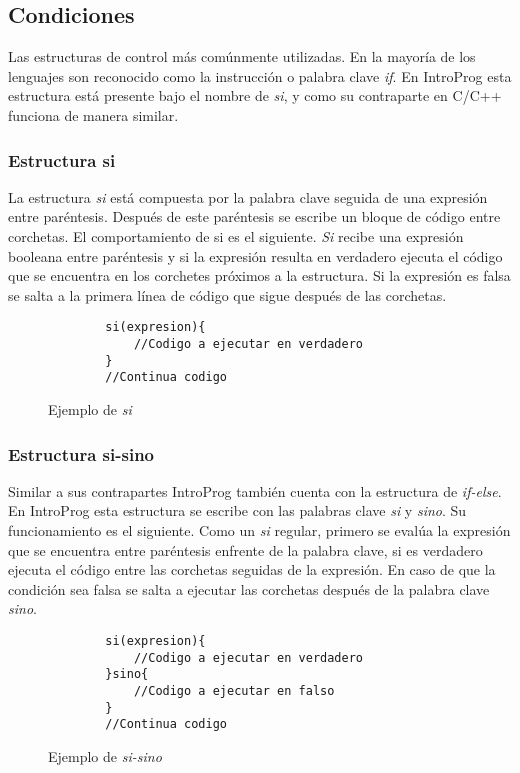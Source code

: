 \subsection{Condiciones}
Las estructuras de control más comúnmente utilizadas. En la mayoría de los lenguajes son reconocido como la instrucción o palabra clave \emph{if}. En IntroProg esta estructura está presente bajo el nombre de \emph{si}, y como su contraparte en C/C++ funciona de manera similar.
\subsubsection{Estructura si}
La estructura \emph{si} está compuesta por la palabra clave seguida de una expresión entre paréntesis. Después de este paréntesis se escribe un bloque de código entre corchetas. El comportamiento de si es el siguiente.
 \emph{Si} recibe una expresión booleana entre paréntesis y si la expresión resulta en verdadero ejecuta el código que se encuentra en los corchetes próximos a la estructura. Si la expresión es falsa se salta a la primera línea de código que sigue después de las corchetas.

\begin{figure}[!htbp]
    \centering
    
    \begin{lstlisting}
        si(expresion){
            //Codigo a ejecutar en verdadero
        }
        //Continua codigo
    \end{lstlisting}
    \caption{Ejemplo de \emph{si}}
\end{figure}
\FloatBarrier
\subsubsection{Estructura si-sino}
Similar a sus contrapartes IntroProg también cuenta con la estructura de \emph{if-else}. En IntroProg esta estructura se escribe con las palabras clave \emph{si} y \emph{sino}. Su funcionamiento es el siguiente. Como un \emph{si} regular, primero se evalúa la expresión que se encuentra entre paréntesis enfrente de la palabra clave, si es verdadero ejecuta el código entre las corchetas seguidas de la expresión. En caso de que la condición sea falsa se salta a ejecutar las corchetas después de la palabra clave \emph{sino}.

\begin{figure}[!htbp]
    \centering
    
    \begin{lstlisting}
        si(expresion){
            //Codigo a ejecutar en verdadero
        }sino{
            //Codigo a ejecutar en falso
        }
        //Continua codigo
    \end{lstlisting}
    \caption{Ejemplo de \emph{si-sino}}
\end{figure}
\FloatBarrier

